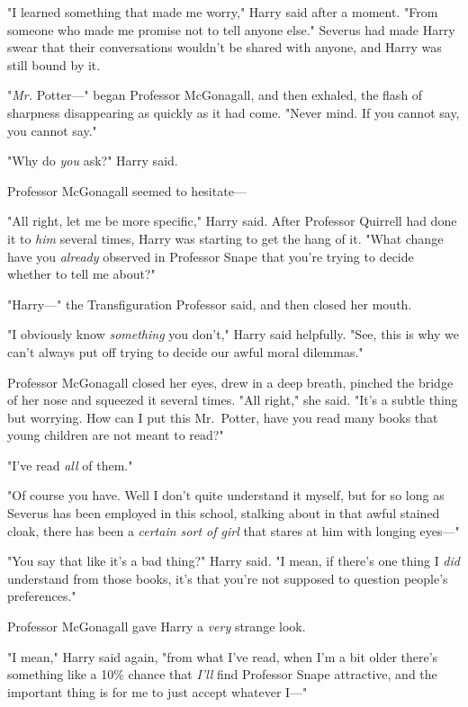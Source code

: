 "I learned something that made me worry," Harry said after a moment. "From
someone who made me promise not to tell anyone else." Severus had made Harry
swear that their conversations wouldn't be shared with anyone, and Harry was
still bound by it.

"\emph{Mr.} Potter---" began Professor McGonagall, and then exhaled, the flash
of sharpness disappearing as quickly as it had come. "Never mind. If you cannot
say, you cannot say."

"Why do \emph{you} ask?" Harry said.

Professor McGonagall seemed to hesitate---

"All right, let me be more specific," Harry said. After Professor Quirrell had
done it to \emph{him} several times, Harry was starting to get the hang of it.
"What change have you \emph{already} observed in Professor Snape that you're
trying to decide whether to tell me about?"

"Harry---" the Transfiguration Professor said, and then closed her mouth.

"I obviously know \emph{something} you don't," Harry said helpfully. "See, this
is why we can't always put off trying to decide our awful moral dilemmas."

Professor McGonagall closed her eyes, drew in a deep breath, pinched the bridge
of her nose and squeezed it several times. "All right," she said. "It's a
subtle thing{\el} but worrying. How can I put this{\el} Mr.~Potter, have
you read many books that young children are not meant to read?"

"I've read \emph{all} of them."

"Of course you have. Well{\el} I don't quite understand it myself, but for
so long as Severus has been employed in this school, stalking about in that
awful stained cloak, there has been a \emph{certain sort of girl} that stares
at him with longing eyes---"

"You say that like it's a bad thing?" Harry said. "I mean, if there's one thing
I \emph{did} understand from those books, it's that you're not supposed to
question people's preferences."

Professor McGonagall gave Harry a \emph{very} strange look.

"I mean," Harry said again, "from what I've read, when I'm a bit older there's
something like a 10\% chance that \emph{I'll} find Professor Snape attractive,
and the important thing is for me to just accept whatever I---"


